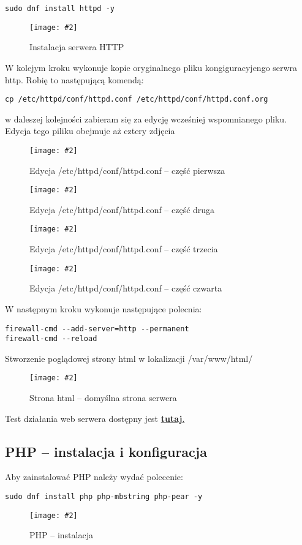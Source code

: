 \documentclass[a4paper]{article}
\newcommand*{\zdj}[2][\textwidth]{\texttt{[image: \#2]}}
\newcommand*{\fg}[4][!htb]{
      \begin{figure*}[#1]
            \zdj{#2}
            \caption[#4]{#3}
      \end{figure*}
}
\begin{document}
\vspace*{-5pt}
\begin{Verbatim}[frame=single]
sudo dnf install httpd -y
\end{Verbatim}
\vspace*{-20pt}
\fg{contents/configuration/HTTP/1.png}{Instalacja serwera HTTP}{Instalacja serwera HTTP}
\vspace*{-10pt}
W kolejym kroku wykonuje kopie oryginalnego pliku kongiguracyjengo serwra http. Robię to następującą komendą: 
\vspace*{-5pt}
\begin{Verbatim}[frame=single]
cp /etc/httpd/conf/httpd.conf /etc/httpd/conf/httpd.conf.org 
\end{Verbatim}
\vspace*{-5pt}
w daleszej kolejności zabieram się za edycję wcześniej wspomnianego pliku. Edycja tego piliku obejmuje aż cztery zdjęcia
\fg{contents/configuration/HTTP/3.png}{Edycja /etc/httpd/conf/httpd.conf – część pierwsza}{Edycja /etc/httpd/conf/httpd.conf – 1}
\newpage
\fg{contents/configuration/HTTP/4.png}{Edycja /etc/httpd/conf/httpd.conf – część druga}{Edycja /etc/httpd/conf/httpd.conf – 2}
\fg{contents/configuration/HTTP/5.png}{Edycja /etc/httpd/conf/httpd.conf – część trzecia}{Edycja /etc/httpd/conf/httpd.conf – 3}
\newpage
\fg{contents/configuration/HTTP/6.png}{Edycja /etc/httpd/conf/httpd.conf – część czwarta}{Edycja /etc/httpd/conf/httpd.conf – 4}
W następnym kroku wykonuje następujące polecnia: 
\begin{Verbatim}[frame=single]
firewall-cmd --add-server=http --permanent
firewall-cmd --reload
\end{Verbatim}
Stworzenie poglądowej strony html w lokalizacji /var/www/html/
\fg{contents/configuration/HTTP/8.png}{Strona html – domyślna strona serwera}{Strona html – domyślna strona serwera}

Test działania web serwera dostępny jest \hyperref[fig:http-test]{\textbf{tutaj}.}

\newpage
\subsection{PHP – instalacja i konfiguracja}
Aby zainstalować PHP należy wydać polecenie:
\begin{Verbatim}[frame=single]
sudo dnf install php php-mbstring php-pear -y
\end{Verbatim}
\fg{contents/configuration/PHP/1.png}{PHP – instalacja}{PHP – instalacja}
\end{document}
